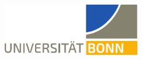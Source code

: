 \begin{titlepage}

	\begin{addmargin}[-2cm]{-2.5cm}
    \begin{center}
        \large
        
		\begin{flushleft}
		\includegraphics[width=6cm]{gfx/logos/unilogobonn}
		\end{flushleft}
       
        \vfill

        \begingroup
            \color{Blue}\spacedallcaps{\myTitle} \bigskip
        \endgroup

        \spacedlowsmallcaps{\myName}

        \vfill

        \medskip

        \myDegree \\ \medskip
        \myTime

        \bigskip

        \vfill

	\myUni \\
        \myDepartment \\
        \myFaculty \\


    \end{center}
  \end{addmargin}
\end{titlepage}   